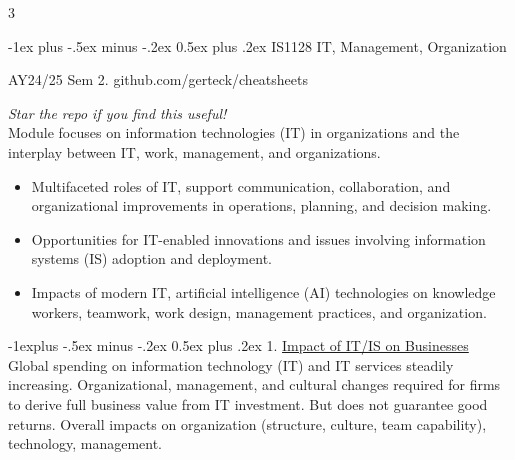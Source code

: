 \documentclass[10pt, landscape]{article}
\makeatletter
\renewcommand{\section}{\@startsection{section}{1}{0mm}%
                                {-1ex plus -.5ex minus -.2ex}%
                                {0.5ex plus .2ex}%
                                {\normalfont\large\bfseries}}
\renewcommand{\subsection}{\@startsection{subsection}{2}{0mm}%
                                {-1explus -.5ex minus -.2ex}%
                                {0.5ex plus .2ex}%
                                {\normalfont\normalsize\bfseries}}
\makeatother
\begin{document}
\raggedright
\footnotesize
\begin{multicols*}{3}

\setlength{\columnseprule}{0pt}
\setlength{\premulticols}{1pt}
\setlength{\postmulticols}{1pt}
\setlength{\multicolsep}{2pt}
\setlength{\columnsep}{2pt}

\section{IS1128 IT, Management, Organization}
\centerline{AY24/25 Sem 2. github.com/gerteck/cheatsheets}
\textit{Star the repo if you find this useful!}\\
Module focuses on information technologies (IT) in organizations and the interplay between IT, work, management, and organizations. 
\begin{itemize}
\item Multifaceted roles of IT, support communication, collaboration, and organizational improvements in operations, planning, and decision making.
\item Opportunities for IT-enabled innovations and issues involving information systems (IS) adoption and deployment.
\item Impacts of modern IT, artificial intelligence (AI) technologies on knowledge workers, teamwork, work design, management practices, and organization. 
\end{itemize}


\subsection{1. \underline{Impact of IT/IS on Businesses}}
Global spending on information technology (IT) and IT services steadily increasing. Organizational, management, and cultural changes required for firms to derive full business value from IT investment. But does not guarantee good returns. Overall impacts on organization (structure, culture, team capability), technology, management. 



\end{multicols*}
\end{document}

